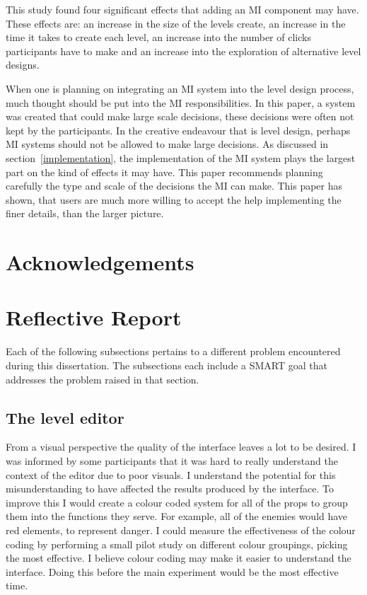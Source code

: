\documentclass[journal]{IEEEtran}
\begin{document}
This study found four significant effects that adding an MI component may have. These effects are: an increase in the size of the levels create, an increase in the time it takes to create each level, an increase into the number of clicks participants have to make and an increase into the exploration of alternative level designs. 

When one is planning on integrating an MI system into the level design process, much thought should be put into the MI responsibilities. In this paper, a system was created that could make large scale decisions, these decisions were often not kept by the participants. In the creative endeavour that is level design, perhaps MI systems should not be allowed to make large decisions. As discussed in section~\ref{implementation}, the implementation of the MI system plays the largest part on the kind of effects it may have. This paper recommends planning carefully the type and scale of the decisions the MI can make. This paper has shown, that users are much more willing to accept the help implementing the finer details, than the larger picture.




\appendices
\section{Acknowledgements}
	

\section{Reflective Report}
Each of the following subsections pertains to a different problem encountered during this dissertation. The subsections each include a SMART goal that addresses the problem raised in that section.

\subsection{The level editor}
From a visual perspective the quality of the interface leaves a lot to be desired. I was informed by some participants that it was hard to really understand the context of the editor due to poor visuals. I understand the potential for this misunderstanding to have affected the results produced by the interface. To improve this I would create a colour coded system for all of the props to group them into the functions they serve. For example, all of the enemies would have red elements, to represent danger. I could measure the effectiveness of the colour coding by performing a small pilot study on different colour groupings, picking the most effective. I believe colour coding may make it easier to understand the interface. Doing this before the main experiment would be the most effective time. 
\end{document}
